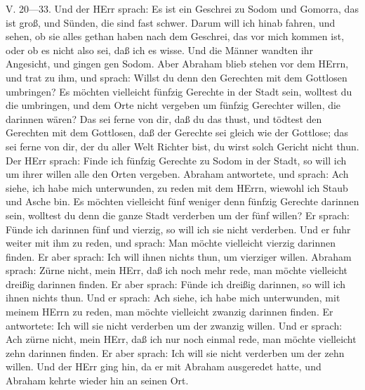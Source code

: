 \begin{schriftzitat}
V. 20—33. Und der HErr sprach: Es ist ein Geschrei zu Sodom und Gomorra, das ist groß, und Sünden, die sind fast schwer. Darum will ich hinab fahren, und sehen, ob sie alles gethan haben nach dem Geschrei, das vor mich kommen ist, oder ob es nicht also sei, daß ich es wisse. Und die Männer wandten ihr Angesicht, und gingen gen Sodom. Aber Abraham blieb stehen vor dem HErrn, und trat zu ihm, und sprach: Willst du denn den Gerechten mit dem Gottlosen umbringen? Es möchten vielleicht fünfzig Gerechte in
der Stadt sein, wolltest du die umbringen, und dem Orte nicht vergeben um fünfzig Gerechter willen, die darinnen wären? Das sei ferne von dir, daß du das thust, und tödtest den Gerechten mit dem Gottlosen, daß der Gerechte sei gleich wie der Gottlose; das sei ferne von dir, der du aller Welt Richter bist, du wirst solch Gericht nicht thun. Der HErr sprach: Finde ich fünfzig Gerechte zu Sodom in der Stadt, so will ich um ihrer willen alle den Orten vergeben. Abraham antwortete, und sprach: Ach siehe, ich habe mich unterwunden, zu reden mit dem HErrn, wiewohl ich Staub und Asche bin. Es möchten vielleicht fünf weniger denn fünfzig Gerechte darinnen sein, wolltest du denn die ganze Stadt verderben um der fünf willen? Er sprach: Fünde ich darinnen fünf und vierzig, so will ich sie nicht verderben. Und er fuhr weiter mit ihm zu reden, und sprach: Man möchte vielleicht vierzig darinnen finden. Er aber sprach: Ich will ihnen nichts thun, um vierziger willen. Abraham sprach: Zürne nicht, mein HErr, daß ich noch mehr rede, man möchte vielleicht dreißig darinnen finden. Er aber sprach: Fünde ich dreißig darinnen, so will ich ihnen nichts thun. Und er sprach: Ach siehe, ich habe mich unterwunden, mit meinem HErrn zu reden, man möchte vielleicht zwanzig darinnen finden. Er antwortete: Ich will sie nicht verderben um der zwanzig willen. Und er sprach: Ach zürne nicht, mein HErr, daß ich nur noch einmal rede, man möchte vielleicht zehn darinnen finden. Er aber sprach: Ich will sie nicht verderben um der zehn willen. Und der HErr ging hin, da er mit Abraham ausgeredet hatte, und Abraham kehrte wieder hin an seinen Ort.
\end{schriftzitat}

